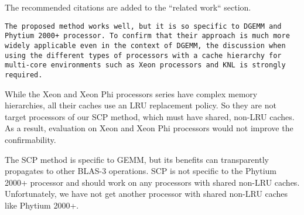 \documentclass[]{article}
\begin{document}
The recommended citations are added to the ``related work`` section.

\begin{verbatim}
The proposed method works well, but it is so specific to DGEMM and
Phytium 2000+ processor. To confirm that their approach is much more
widely applicable even in the context of DGEMM, the discussion when
using the different types of processors with a cache hierarchy for
multi-core environments such as Xeon processors and KNL is strongly
required.
\end{verbatim}

While the Xeon and Xeon Phi processors series
have complex memory hierarchies,
all their caches use an LRU replacement policy.
So they are not target processors of our SCP method,
which must have shared, non-LRU caches.
As a result, evaluation on Xeon and Xeon Phi processors would not
improve the confirmability.

The SCP method is specific to GEMM, but its benefits can transparently
propagates to other BLAS-3 operations.
SCP is not specific to the Phytium 2000+ processor and
should work on any processors with shared non-LRU caches.
Unfortunately, we have not get another processor with shared
non-LRU caches like Phytium 2000+. 
\end{document}
